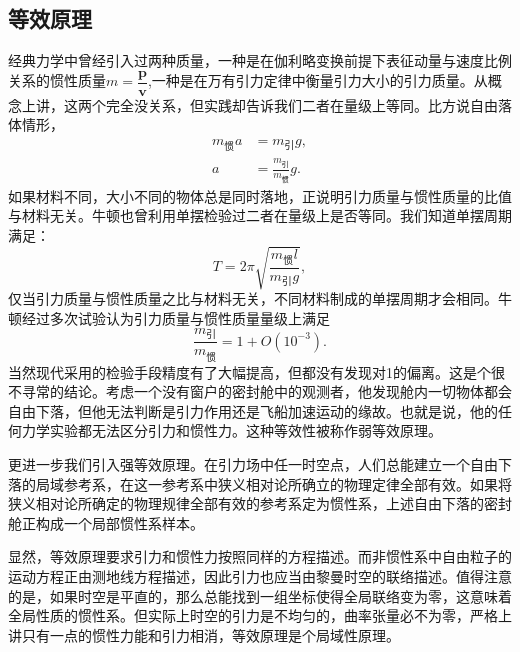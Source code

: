 \documentclass[11pt, a4paper, oneside, onecolumn]{ctexart}
\numberwithin{equation}{subsection}
\begin{document}
\subsection{等效原理}
经典力学中曾经引入过两种质量，一种是在伽利略变换前提下表征动量与速度比例关系的惯性质量$m=\dfrac{\boldsymbol{p}}{\boldsymbol{v}}$,一种是在万有引力定律中衡量引力大小的引力质量。从概念上讲，这两个完全没关系，但实践却告诉我们二者在量级上等同。比方说自由落体情形，
\begin{align}
m_{\text{惯}}a&=m_{\text{引}}g,\\
a&=\frac{m_{\text{引}}}{m_{\text{惯}}}g.
\end{align}
如果材料不同，大小不同的物体总是同时落地，正说明引力质量与惯性质量的比值与材料无关。牛顿也曾利用单摆检验过二者在量级上是否等同。我们知道单摆周期满足：
\begin{equation}
T=2\pi\sqrt{\frac{m_{\text{惯}}l}{m_{\text{引}}g}},
\end{equation}
仅当引力质量与惯性质量之比与材料无关，不同材料制成的单摆周期才会相同。牛顿经过多次试验认为引力质量与惯性质量量级上满足
\begin{equation}
\frac{m_{\text{引}}}{m_{\text{惯}}}=1+O\left(10^{-3}\right).
\end{equation}
当然现代采用的检验手段精度有了大幅提高，但都没有发现对1的偏离。这是个很不寻常的结论。考虑一个没有窗户的密封舱中的观测者，他发现舱内一切物体都会自由下落，但他无法判断是引力作用还是飞船加速运动的缘故。也就是说，他的任何力学实验都无法区分引力和惯性力。这种等效性被称作弱等效原理。

更进一步我们引入强等效原理。在引力场中任一时空点，人们总能建立一个自由下落的局域参考系，在这一参考系中狭义相对论所确立的物理定律全部有效。如果将狭义相对论所确定的物理规律全部有效的参考系定为惯性系，上述自由下落的密封舱正构成一个局部惯性系样本。

显然，等效原理要求引力和惯性力按照同样的方程描述。而非惯性系中自由粒子的运动方程正由测地线方程描述，因此引力也应当由黎曼时空的联络描述。值得注意的是，如果时空是平直的，那么总能找到一组坐标使得全局联络变为零，这意味着全局性质的惯性系。但实际上时空的引力是不均匀的，曲率张量必不为零，严格上讲只有一点的惯性力能和引力相消，等效原理是个局域性原理。
\end{document}
